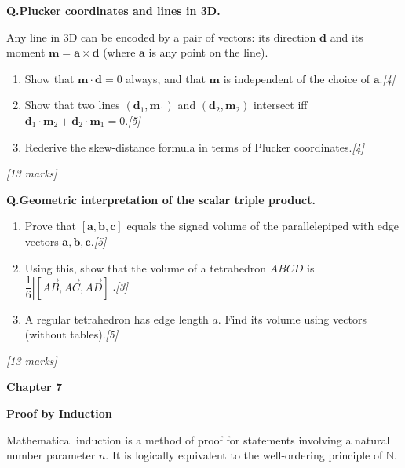 \documentclass[12pt,a4paper]{article}
\theoremstyle{defstyle}
\newcounter{qnum}
\newcommand{\Q}[1]{\stepcounter{qnum}\medskip\noindent\textbf{Q\theqnum.}\quad #1\par}
\newcommand{\mks}[1]{\hfill\textit{[#1 marks]}}
\newcommand{\chapterbanner}[2]{%
  \clearpage
  \begin{tcolorbox}[colback=chaptercol!10, colframe=chaptercol,
      left=10pt, right=10pt, top=8pt, bottom=8pt]
    {\large\bfseries\color{chaptercol} Chapter #1}\par\vspace{2pt}
    {\LARGE\bfseries #2}
  \end{tcolorbox}
  \vspace{6pt}
}
\begin{document}
\vspace{8pt}

\begin{tcolorbox}[explore, title={\color{explorecol}\bfseries Exploration (Beyond Syllabus)}]

\Q{\textbf{Plucker coordinates and lines in 3D.}

Any line in 3D can be encoded by a pair of vectors: its direction $\mathbf{d}$ and its moment $\mathbf{m}=\mathbf{a}\times\mathbf{d}$ (where $\mathbf{a}$ is any point on the line).
\begin{enumerate}[label=(\alph*),itemsep=4pt]
  \item Show that $\mathbf{m}\cdot\mathbf{d}=0$ always, and that $\mathbf{m}$ is independent of the choice of $\mathbf{a}$.\hfill\textit{[4]}
  \item Show that two lines $(\mathbf{d}_1,\mathbf{m}_1)$ and $(\mathbf{d}_2,\mathbf{m}_2)$ intersect iff $\mathbf{d}_1\cdot\mathbf{m}_2+\mathbf{d}_2\cdot\mathbf{m}_1=0$.\hfill\textit{[5]}
  \item Rederive the skew-distance formula in terms of Plucker coordinates.\hfill\textit{[4]}
\end{enumerate}\mks{13}}

\Q{\textbf{Geometric interpretation of the scalar triple product.}

\begin{enumerate}[label=(\alph*),itemsep=4pt]
  \item Prove that $[\mathbf{a},\mathbf{b},\mathbf{c}]$ equals the signed volume of the parallelepiped with edge vectors $\mathbf{a},\mathbf{b},\mathbf{c}$.\hfill\textit{[5]}
  \item Using this, show that the volume of a tetrahedron $ABCD$ is $\dfrac{1}{6}|[\overrightarrow{AB},\overrightarrow{AC},\overrightarrow{AD}]|$.\hfill\textit{[3]}
  \item A regular tetrahedron has edge length $a$. Find its volume using vectors (without tables).\hfill\textit{[5]}
\end{enumerate}\mks{13}}

\end{tcolorbox}

\chapterbanner{7}{Proof by Induction}

Mathematical induction is a method of proof for statements involving a natural number parameter \(n\). It is logically equivalent to the well-ordering principle of \(\mathbb{N}\).
\end{document}
